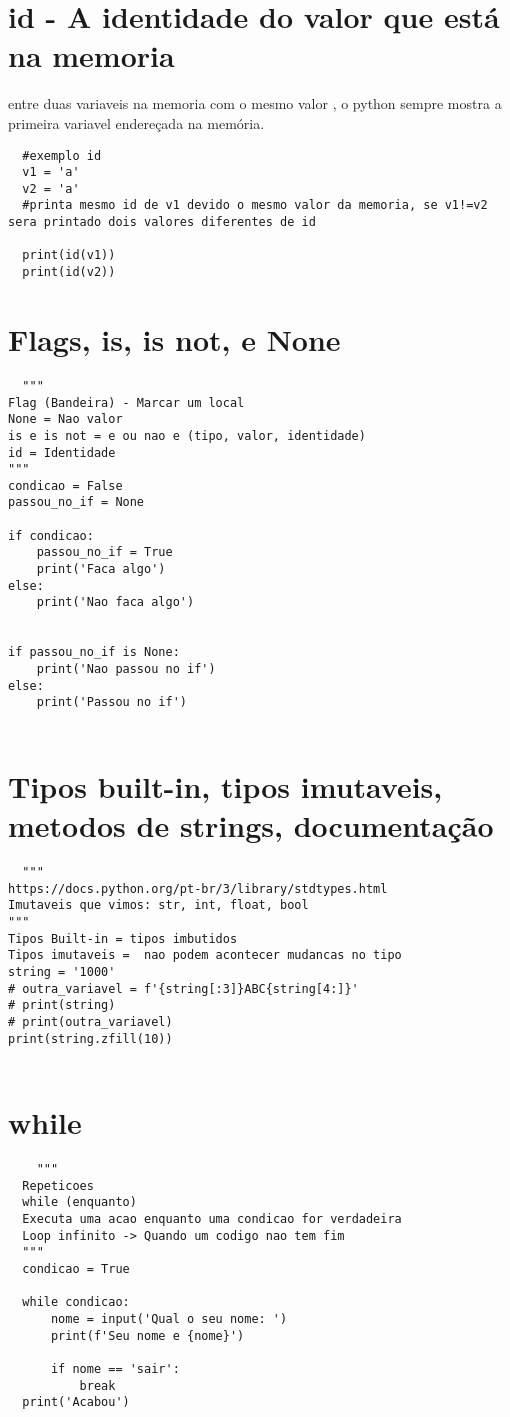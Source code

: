 \documentclass[16pts]{article}
\begin{document}
\section{id - A identidade do valor que está na memoria}
entre duas variaveis na memoria com o mesmo valor , o python sempre mostra a primeira variavel endereçada na  memória.
\begin{lstlisting}
  #exemplo id
  v1 = 'a'
  v2 = 'a'
  #printa mesmo id de v1 devido o mesmo valor da memoria, se v1!=v2 sera printado dois valores diferentes de id 

  print(id(v1))
  print(id(v2))

\end{lstlisting}
\section{Flags, is, is not, e None}
\begin{lstlisting}
  """
Flag (Bandeira) - Marcar um local
None = Nao valor
is e is not = e ou nao e (tipo, valor, identidade)
id = Identidade
"""
condicao = False
passou_no_if = None

if condicao:
    passou_no_if = True
    print('Faca algo')
else:
    print('Nao faca algo')


if passou_no_if is None:
    print('Nao passou no if')
else:
    print('Passou no if')
  
\end{lstlisting}
\section{Tipos built-in, tipos imutaveis, metodos de strings, documentação}
\begin{lstlisting}
  """
https://docs.python.org/pt-br/3/library/stdtypes.html
Imutaveis que vimos: str, int, float, bool
"""
Tipos Built-in = tipos imbutidos
Tipos imutaveis =  nao podem acontecer mudancas no tipo
string = '1000'
# outra_variavel = f'{string[:3]}ABC{string[4:]}'
# print(string)
# print(outra_variavel)
print(string.zfill(10))
  
\end{lstlisting}
\section{while}
  \begin{lstlisting}
    """
  Repeticoes
  while (enquanto)
  Executa uma acao enquanto uma condicao for verdadeira
  Loop infinito -> Quando um codigo nao tem fim
  """
  condicao = True

  while condicao:
      nome = input('Qual o seu nome: ')
      print(f'Seu nome e {nome}')

      if nome == 'sair':
          break
  print('Acabou')
  \end{lstlisting}
\end{document}
